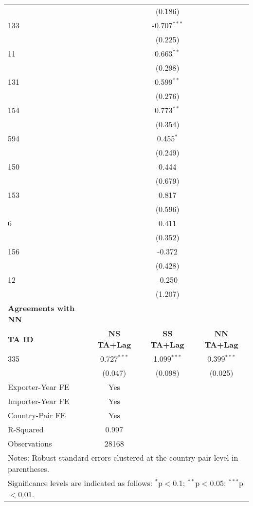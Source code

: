 \begin{center}
\begin{longtable}{lccc}
    &  & (0.186) &  \\
    133 &  & -0.707$^{\ast\ast\ast}$ &  \\
    &  & (0.225) &  \\
    11  &  & 0.663$^{\ast\ast}$ &  \\
    &  & (0.298) &  \\
    131  &  & 0.599$^{\ast\ast}$ &  \\
    &  & (0.276) &  \\
    154  &  & 0.773$^{\ast\ast}$ &  \\
    &  & (0.354) &  \\
    594  &  & 0.455$^{\ast}$ &  \\
    &  & (0.249) &  \\
    150 &  & 0.444 &  \\
    &  & (0.679) &  \\
    153 &  & 0.817 &  \\
    &  & (0.596) &  \\
    6   &  & 0.411 &  \\
    &  & (0.352) &  \\
    156   &  & -0.372 &  \\
    &  & (0.428) &  \\
    12   &  & -0.250 &  \\
    &  & (1.207) &  \\
    \hline
    \textbf{Agreements with NN} &  &  &  \\
    \hline
    \textbf{TA ID} & \textbf{NS TA+Lag} & \textbf{SS TA+Lag} & \textbf{NN TA+Lag} \\
    \hline
    335 & 0.727$^{\ast\ast\ast}$ & 1.099$^{\ast\ast\ast}$ & 0.399$^{\ast\ast\ast}$ \\
    & (0.047) & (0.098) & (0.025) \\
    \hline
    Exporter-Year FE & Yes \\
    Importer-Year FE & Yes \\
    Country-Pair FE & Yes \\
    R-Squared & 0.997 \\
    Observations & 28168 \\
    \hline
    \multicolumn{4}{l}{\footnotesize{Notes: Robust standard errors clustered at the country-pair level in parentheses.}} \\
    \multicolumn{4}{l}{\footnotesize{Significance levels are indicated as follows: $^{\ast}$p$<$0.1; $^{\ast\ast}$p$<$0.05; $^{\ast\ast\ast}$p$<$0.01.}} \\
\end{longtable}
\end{center}


